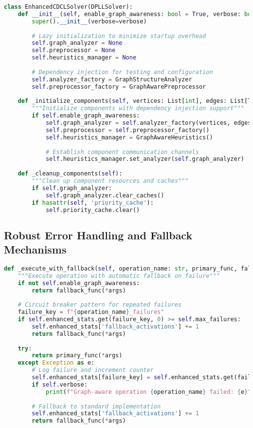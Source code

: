 \begin{lstlisting}[language=Python, caption=Module Dependency Management]
class EnhancedCDCLSolver(DPLLSolver):
    def __init__(self, enable_graph_awareness: bool = True, verbose: bool = False):
        super().__init__(verbose=verbose)
        
        # Lazy initialization to minimize startup overhead
        self.graph_analyzer = None
        self.preprocessor = None
        self.heuristics_manager = None
        
        # Dependency injection for testing and configuration
        self.analyzer_factory = GraphStructureAnalyzer
        self.preprocessor_factory = GraphAwarePreprocessor
        
    def _initialize_components(self, vertices: List[int], edges: List[Tuple[int, int]]):
        """Initialize components with dependency injection support"""
        if self.enable_graph_awareness:
            self.graph_analyzer = self.analyzer_factory(vertices, edges)
            self.preprocessor = self.preprocessor_factory()
            self.heuristics_manager = GraphAwareHeuristics()
            
            # Establish component communication channels
            self.heuristics_manager.set_analyzer(self.graph_analyzer)
        
    def _cleanup_components(self):
        """Clean up component resources and caches"""
        if self.graph_analyzer:
            self.graph_analyzer.clear_caches()
        if hasattr(self, 'priority_cache'):
            self.priority_cache.clear()
\end{lstlisting}

\subsection{Robust Error Handling and Fallback Mechanisms}
\label{appendix:error-handling}

\begin{lstlisting}[language=Python, caption=Robust Error Handling and Fallback Mechanisms]
def _execute_with_fallback(self, operation_name: str, primary_func, fallback_func, *args):
    """Execute operation with automatic fallback on failure"""
    if not self.enable_graph_awareness:
        return fallback_func(*args)
    
    # Circuit breaker pattern for repeated failures
    failure_key = f"{operation_name}_failures"
    if self.enhanced_stats.get(failure_key, 0) >= self.max_failures:
        self.enhanced_stats['fallback_activations'] += 1
        return fallback_func(*args)
    
    try:
        return primary_func(*args)
    except Exception as e:
        # Log failure and increment counter
        self.enhanced_stats[failure_key] = self.enhanced_stats.get(failure_key, 0) + 1
        if self.verbose:
            print(f"Graph-aware operation {operation_name} failed: {e}")
        
        # Fallback to standard implementation
        self.enhanced_stats['fallback_activations'] += 1
        return fallback_func(*args)
\end{lstlisting}

